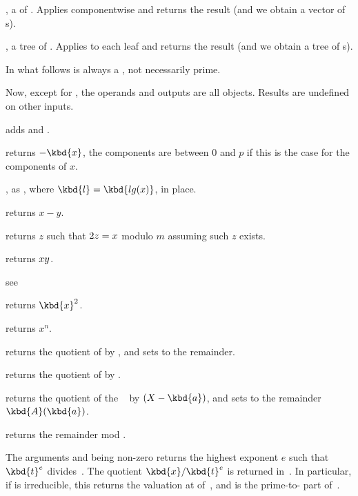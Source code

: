 ,  a  of . Applies
 componentwise and returns the result (and we obtain a vector
of s).

,  a tree of . Applies
 to each leaf and returns the result (and we obtain a tree
of s).

 In what follows  is always a ,
not necessarily prime.

\noindent Now, except for , the operands and outputs are all 
objects. Results are undefined on other inputs.

 adds  and .

 returns $-\kbd{x}$, the components are
between $0$ and $p$ if this is the case for the components of $x$.

, as , where
$\kbd{l} = \kbd{lg(x)}$, in place.

 returns $x-y$.

 returns $z$ such that $2\*z = x$ modulo
$m$ assuming such $z$ exists.

 returns $x\*y$.

see 

 returns $\kbd{x}^2$.

 returns $x^n$.

 returns the quotient
of  by , and sets  to the remainder.

 returns the quotient of  by
.

 returns the
quotient of the ~ by $(X - \kbd{a})$, and sets  to the
remainder $\kbd{A}(\kbd{a})$.

 returns the remainder  mod
.

 The arguments  and
 being non-zero  returns the highest exponent $e$ such that
$\kbd{t}^{e}$ divides~. The quotient $\kbd{x}/\kbd{t}^{e}$ is returned
in~. In particular, if  is irreducible, this returns the
valuation at  of~, and  is the prime-to- part
of~.

